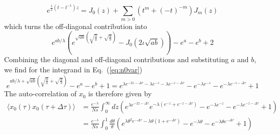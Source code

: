 \documentclass[prl,preprint]{revtex4}
\newcommand{\EQ}[1]{Eq.~(\ref{eq:#1})}
\newcommand{\x}{x}
\newcommand{\cp}{\iota}
\newcommand{\la}{\langle}
\newcommand{\ra}{\rangle}
\begin{document}
\begin{equation}
e^{\frac{1}{2}(t-t^{-1})z} =J_0(z) +  \sum_{m>0} (t^m+(-t)^{-m}) J_m(z) 
\end{equation}
which turns the off-diagonal contribution into 
\begin{equation}
e^{ab/\lambda}\left(e^{\sqrt{ab} \left(\sqrt{\frac{b}{a}}+\sqrt{\frac{a}{b}}\right)}-J_0(2\cp\sqrt{ab})\right)-e^a-e^b+2
\end{equation}
Combining the diagonal and off-diagonal contributions and substituting $a$ and $b$, we find for the integrand in \EQ{n0var}
\begin{equation}
e^{ab/\lambda+\sqrt{ab} \left(\sqrt{\frac{b}{a}}+\sqrt{\frac{a}{b}}\right)}-e^a-e^b+1 = 
e^{\lambda e^{-2z-\Delta \tau}-\lambda e^{-z} -\lambda e^{-z-\Delta \tau}}-e^{-\lambda e^{-z}}-e^{-\lambda e^{-z-\Delta \tau}}+1
\end{equation}
The auto-correlation of $\x_0$ is therefore given by
\begin{equation}
\begin{split}
\la \x_0(\tau) \x_0(\tau+\Delta\tau)\ra & = \frac{e^{-\lambda}}{Ns} \int_0^\infty dz \left(e^{\lambda e^{-2z-\Delta\tau}}e^{-\lambda(e^{-z}+e^{-z-\Delta\tau})}-e^{-\lambda e^{-z}}-e^{-\lambda e^{-z-\Delta\tau}}+1\right) \\
&= \frac{e^{-\lambda}}{Ns} \int_0^1 \frac{d\theta}{\theta} \left(e^{\lambda \theta^2 e^{-\Delta\tau} -\lambda\theta(1+e^{-\Delta\tau})}-e^{-\lambda \theta}-e^{-\lambda \theta e^{-\Delta\tau}}+1\right)
\end{split}
\end{equation}
\end{document}

